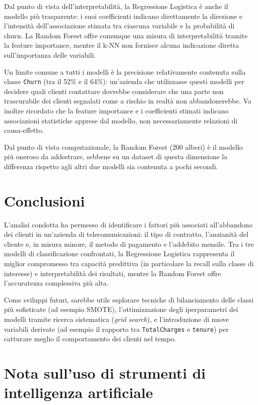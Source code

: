 \documentclass[11pt,a4paper]{article}
\begin{document}
Dal punto di vista dell'interpretabilit\`a, la Regressione Logistica \`e anche il modello pi\`u trasparente: i suoi coefficienti indicano direttamente la direzione e l'intensit\`a dell'associazione stimata tra ciascuna variabile e la probabilit\`a di churn. La Random Forest offre comunque una misura di interpretabilit\`a tramite la feature importance, mentre il k-NN non fornisce alcuna indicazione diretta sull'importanza delle variabili.

Un limite comune a tutti i modelli \`e la precisione relativamente contenuta sulla classe \texttt{Churn} (tra il 52\% e il 64\%): un'azienda che utilizzasse questi modelli per decidere quali clienti contattare dovrebbe considerare che una parte non trascurabile dei clienti segnalati come a rischio in realt\`a non abbandonerebbe. Va inoltre ricordato che la feature importance e i coefficienti stimati indicano associazioni statistiche apprese dal modello, non necessariamente relazioni di causa-effetto.

Dal punto di vista computazionale, la Random Forest (200 alberi) \`e il modello pi\`u oneroso da addestrare, sebbene su un dataset di questa dimensione la differenza rispetto agli altri due modelli sia contenuta a pochi secondi.

\section{Conclusioni}

L'analisi condotta ha permesso di identificare i fattori pi\`u associati all'abbandono dei clienti in un'azienda di telecomunicazioni: il tipo di contratto, l'anzianit\`a del cliente e, in misura minore, il metodo di pagamento e l'addebito mensile. Tra i tre modelli di classificazione confrontati, la Regressione Logistica rappresenta il miglior compromesso tra capacit\`a predittiva (in particolare la recall sulla classe di interesse) e interpretabilit\`a dei risultati, mentre la Random Forest offre l'accuratezza complessiva pi\`u alta.

Come sviluppi futuri, sarebbe utile esplorare tecniche di bilanciamento delle classi pi\`u sofisticate (ad esempio SMOTE), l'ottimizzazione degli iperparametri dei modelli tramite ricerca sistematica (\emph{grid search}), e l'introduzione di nuove variabili derivate (ad esempio il rapporto tra \texttt{TotalCharges} e \texttt{tenure}) per catturare meglio il comportamento dei clienti nel tempo.

\section*{Nota sull'uso di strumenti di intelligenza artificiale}
\end{document}
